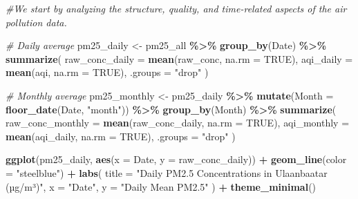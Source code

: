 \documentclass[
]{article}
\newenvironment{Shaded}{\begin{snugshade}}{\end{snugshade}}
\newcommand{\AttributeTok}[1]{\textcolor[rgb]{0.13,0.29,0.53}{#1}}
\newcommand{\CommentTok}[1]{\textcolor[rgb]{0.56,0.35,0.01}{\textit{#1}}}
\newcommand{\ConstantTok}[1]{\textcolor[rgb]{0.56,0.35,0.01}{#1}}
\newcommand{\FunctionTok}[1]{\textcolor[rgb]{0.13,0.29,0.53}{\textbf{#1}}}
\newcommand{\NormalTok}[1]{#1}
\newcommand{\OtherTok}[1]{\textcolor[rgb]{0.56,0.35,0.01}{#1}}
\newcommand{\SpecialCharTok}[1]{\textcolor[rgb]{0.81,0.36,0.00}{\textbf{#1}}}
\newcommand{\StringTok}[1]{\textcolor[rgb]{0.31,0.60,0.02}{#1}}
\begin{document}
\begin{Shaded}
\begin{Highlighting}[]
\CommentTok{\#We start by analyzing the structure, quality, and time{-}related aspects of the air pollution data.}


\CommentTok{\# Daily average}
\NormalTok{pm25\_daily }\OtherTok{\textless{}{-}}\NormalTok{ pm25\_all }\SpecialCharTok{\%\textgreater{}\%}
  \FunctionTok{group\_by}\NormalTok{(Date) }\SpecialCharTok{\%\textgreater{}\%}
  \FunctionTok{summarize}\NormalTok{(}
    \AttributeTok{raw\_conc\_daily =} \FunctionTok{mean}\NormalTok{(raw\_conc, }\AttributeTok{na.rm =} \ConstantTok{TRUE}\NormalTok{),}
    \AttributeTok{aqi\_daily =} \FunctionTok{mean}\NormalTok{(aqi, }\AttributeTok{na.rm =} \ConstantTok{TRUE}\NormalTok{),}
    \AttributeTok{.groups =} \StringTok{"drop"}
\NormalTok{  )}

\CommentTok{\# Monthly average}
\NormalTok{pm25\_monthly }\OtherTok{\textless{}{-}}\NormalTok{ pm25\_daily }\SpecialCharTok{\%\textgreater{}\%}
  \FunctionTok{mutate}\NormalTok{(}\AttributeTok{Month =} \FunctionTok{floor\_date}\NormalTok{(Date, }\StringTok{"month"}\NormalTok{)) }\SpecialCharTok{\%\textgreater{}\%}
  \FunctionTok{group\_by}\NormalTok{(Month) }\SpecialCharTok{\%\textgreater{}\%}
  \FunctionTok{summarize}\NormalTok{(}
    \AttributeTok{raw\_conc\_monthly =} \FunctionTok{mean}\NormalTok{(raw\_conc\_daily, }\AttributeTok{na.rm =} \ConstantTok{TRUE}\NormalTok{),}
    \AttributeTok{aqi\_monthly =} \FunctionTok{mean}\NormalTok{(aqi\_daily, }\AttributeTok{na.rm =} \ConstantTok{TRUE}\NormalTok{),}
    \AttributeTok{.groups =} \StringTok{"drop"}
\NormalTok{  )}
\end{Highlighting}
\end{Shaded}

\begin{Shaded}
\begin{Highlighting}[]
\FunctionTok{ggplot}\NormalTok{(pm25\_daily, }\FunctionTok{aes}\NormalTok{(}\AttributeTok{x =}\NormalTok{ Date, }\AttributeTok{y =}\NormalTok{ raw\_conc\_daily)) }\SpecialCharTok{+}
  \FunctionTok{geom\_line}\NormalTok{(}\AttributeTok{color =} \StringTok{"steelblue"}\NormalTok{) }\SpecialCharTok{+}
  \FunctionTok{labs}\NormalTok{(}
    \AttributeTok{title =} \StringTok{"Daily PM2.5 Concentrations in Ulaanbaatar (µg/m³)"}\NormalTok{,}
    \AttributeTok{x =} \StringTok{"Date"}\NormalTok{,}
    \AttributeTok{y =} \StringTok{"Daily Mean PM2.5"}
\NormalTok{  ) }\SpecialCharTok{+}
  \FunctionTok{theme\_minimal}\NormalTok{()}
\end{Highlighting}
\end{Shaded}
\end{document}
